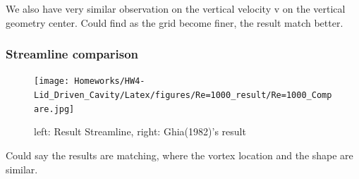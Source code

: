 \documentclass[12pt]{article}
\begin{document}
We also have very similar observation on the vertical velocity v on the vertical geometry center. Could find as the grid become finer, the result match better.


\subsubsection{Streamline comparison}
\begin{figure}[H]
    \centering
    \texttt{[image: Homeworks/HW4-Lid\_Driven\_Cavity/Latex/figures/Re=1000\_result/Re=1000\_Compare.jpg]}
    \caption{left: Result Streamline, right: Ghia(1982)\cite{GHIA1982387}'s result}
\end{figure}

Could say the results are matching, where the vortex location and the shape are similar.


















\end{document}
